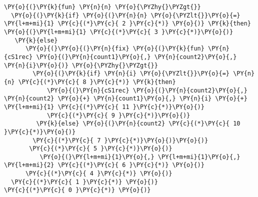 \begin{Verbatim}[commandchars=\\\{\},codes={\catcode`\$=3\catcode`\^=7\catcode`\_=8}]
\PY{o}{(}\PY{k}{fun} \PY{n}{n} \PY{o}{\PYZhy{}\PYZgt{}}
  \PY{o}{(}\PY{k}{if} \PY{o}{(}\PY{n}{n} \PY{o}{\PYZlt{}}\PY{o}{=} \PY{l+m+mi}{1} \PY{c}{(*}\PY{c}{ 2 }\PY{c}{*)} \PY{o}{)} \PY{k}{then} \PY{o}{(}\PY{l+m+mi}{1} \PY{c}{(*}\PY{c}{ 3 }\PY{c}{*)}\PY{o}{)}
   \PY{k}{else}
      \PY{o}{(}\PY{o}{(}\PY{n}{fix} \PY{o}{(}\PY{k}{fun} \PY{n}{cS1rec} \PY{o}{(}\PY{n}{count1}\PY{o}{,} \PY{n}{count2}\PY{o}{,} \PY{n}{i}\PY{o}{)} \PY{o}{\PYZhy{}\PYZgt{}}
        \PY{o}{(}\PY{k}{if} \PY{n}{i} \PY{o}{\PYZlt{}}\PY{o}{=} \PY{n}{n} \PY{c}{(*}\PY{c}{ 8 }\PY{c}{*)} \PY{k}{then}
            \PY{o}{(}\PY{n}{cS1rec} \PY{o}{(}\PY{n}{count2}\PY{o}{,} \PY{n}{count2} \PY{o}{+} \PY{n}{count1}\PY{o}{,} \PY{n}{i} \PY{o}{+} \PY{l+m+mi}{1} \PY{c}{(*}\PY{c}{ 11 }\PY{c}{*)}\PY{o}{)}
            \PY{c}{(*}\PY{c}{ 9 }\PY{c}{*)}\PY{o}{)}
         \PY{k}{else} \PY{o}{(}\PY{n}{count2} \PY{c}{(*}\PY{c}{ 10 }\PY{c}{*)}\PY{o}{)}
        \PY{c}{(*}\PY{c}{ 7 }\PY{c}{*)}\PY{o}{)}\PY{o}{)}
       \PY{c}{(*}\PY{c}{ 5 }\PY{c}{*)}\PY{o}{)}
          \PY{o}{(}\PY{l+m+mi}{1}\PY{o}{,} \PY{l+m+mi}{1}\PY{o}{,} \PY{l+m+mi}{2} \PY{c}{(*}\PY{c}{ 6 }\PY{c}{*)} \PY{o}{)}
      \PY{c}{(*}\PY{c}{ 4 }\PY{c}{*)} \PY{o}{)}
  \PY{c}{(*}\PY{c}{ 1 }\PY{c}{*)} \PY{o}{)}
\PY{c}{(*}\PY{c}{ 0 }\PY{c}{*)} \PY{o}{)}
\end{Verbatim}
